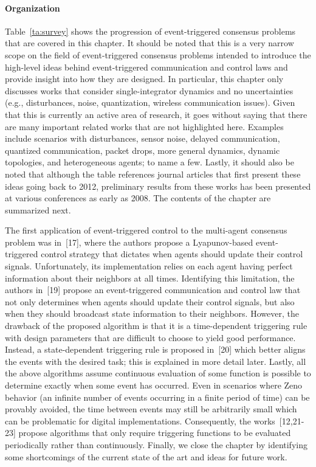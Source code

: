 \documentclass[]{book}
\begin{document}
\paragraph{Organization}
Table~\ref{ta:survey} shows the progression of event-triggered
consensus problems that are covered in this chapter. It should be
noted that this is a very narrow scope on the field of event-triggered
consensus problems intended to introduce the high-level ideas behind
event-triggered communication and control laws and provide insight
into how they are designed.  In particular, this chapter only
discusses works that consider single-integrator dynamics and no
uncertainties (e.g., disturbances, noise, quantization, wireless
communication issues). Given that this is currently an active area of
research, it goes without saying that there are many important related
works that are not highlighted here. Examples include scenarios with
disturbances, sensor noise, delayed communication, quantized
communication, packet drops, more general dynamics, dynamic
topologies, and heterogeneous agents; to name a few. Lastly, it should
also be noted that although the table references journal articles that
first present these ideas going back to 2012, preliminary results from
these works has been presented at various conferences as early as
2008.  The contents of the chapter are summarized next.

The first application of event-triggered control to the multi-agent
consensus problem was in~[17], where the authors
propose a Lyapunov-based event-triggered control strategy that
dictates when agents should update their control signals.
Unfortunately, its implementation relies on each agent having perfect
information about their neighbors at all times. Identifying this
limitation, the authors in~[19] propose an
event-triggered communication and control law that not only determines
when agents should update their control signals, but also when they
should broadcast state information to their neighbors. However, the
drawback of the proposed algorithm is that it is a time-dependent
triggering rule with design parameters that are difficult to choose to
yield good performance. Instead, a state-dependent triggering rule is
proposed in~[20] which better aligns the events
with the desired task; this is explained in more detail later.
Lastly, all the above algorithms assume continuous evaluation of some
function is possible to determine exactly when some event has
occurred. Even in scenarios where Zeno behavior (an infinite number of
events occurring in a finite period of time) can be provably avoided,
the time between events may still be arbitrarily small which can be
problematic for digital implementations.  Consequently, the
works~[12,21-23]
propose algorithms that only require triggering functions to be
evaluated periodically rather than continuously. Finally, we close the
chapter by identifying some shortcomings of the current state of the
art and ideas for future work.
\end{document}
